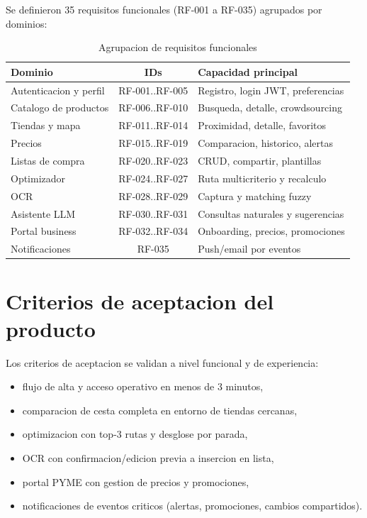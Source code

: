 Se definieron 35 requisitos funcionales (RF-001 a RF-035) agrupados por dominios:

\begin{table}[h]
\centering
\caption{Agrupacion de requisitos funcionales}
\label{tab:rf-grupos}
\begin{tabular}{|l|c|l|}
\hline
\textbf{Dominio} & \textbf{IDs} & \textbf{Capacidad principal} \\
\hline
Autenticacion y perfil & RF-001..RF-005 & Registro, login JWT, preferencias \\
Catalogo de productos & RF-006..RF-010 & Busqueda, detalle, crowdsourcing \\
Tiendas y mapa & RF-011..RF-014 & Proximidad, detalle, favoritos \\
Precios & RF-015..RF-019 & Comparacion, historico, alertas \\
Listas de compra & RF-020..RF-023 & CRUD, compartir, plantillas \\
Optimizador & RF-024..RF-027 & Ruta multicriterio y recalculo \\
OCR & RF-028..RF-029 & Captura y matching fuzzy \\
Asistente LLM & RF-030..RF-031 & Consultas naturales y sugerencias \\
Portal business & RF-032..RF-034 & Onboarding, precios, promociones \\
Notificaciones & RF-035 & Push/email por eventos \\
\hline
\end{tabular}
\end{table}

\section{Criterios de aceptacion del producto}

Los criterios de aceptacion se validan a nivel funcional y de experiencia:

\begin{itemize}
	\item flujo de alta y acceso operativo en menos de 3 minutos,
	\item comparacion de cesta completa en entorno de tiendas cercanas,
	\item optimizacion con top-3 rutas y desglose por parada,
	\item OCR con confirmacion/edicion previa a insercion en lista,
	\item portal PYME con gestion de precios y promociones,
	\item notificaciones de eventos criticos (alertas, promociones, cambios compartidos).
\end{itemize}

